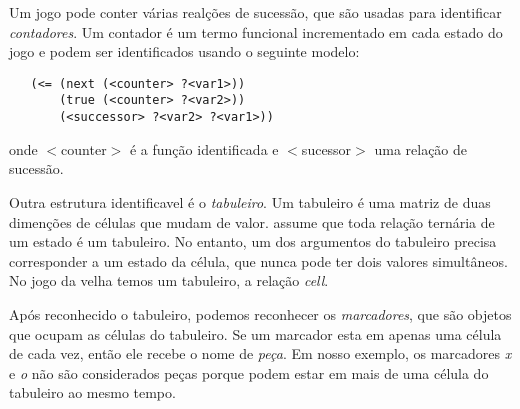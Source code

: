 Um jogo pode conter várias realções de sucessão, que são usadas para identificar
{\it contadores}. Um contador é um termo funcional incrementado em cada estado
do jogo e podem ser identificados usando o seguinte modelo: 
\begin{verbatim}
   (<= (next (<counter> ?<var1>))
       (true (<counter> ?<var2>))
       (<successor> ?<var2> ?<var1>))
\end{verbatim}
onde $<$counter$>$ é a função identificada e $<$sucessor$>$ uma relação de sucessão. 

Outra estrutura identificavel é o {\it tabuleiro}. Um tabuleiro é uma matriz de
duas dimenções de células que mudam de valor. \cite{dresner} assume que toda
relação ternária de um estado é um tabuleiro. No entanto, um dos argumentos do
tabuleiro precisa corresponder a um estado da célula, que nunca pode ter dois
valores simultâneos. No jogo da velha temos um tabuleiro, a relação {\it cell}.

Após reconhecido o tabuleiro, podemos reconhecer os {\it marcadores}, que são
objetos que ocupam as células do tabuleiro. Se um marcador esta em apenas uma
célula de cada vez, então ele recebe o nome de {\it peça}. Em nosso exemplo, os
marcadores {\it x} e {\it o} não são considerados peças porque podem estar em
mais de uma célula do tabuleiro ao mesmo tempo.